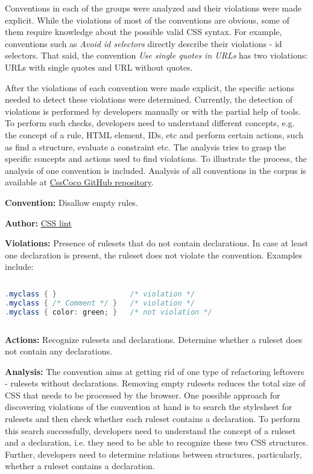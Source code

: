 Conventions in each of the groups were analyzed and their violations were made explicit. While the
violations of most of the conventions are obvious, some of them require knowledge about the possible
valid CSS syntax. For example, conventions such as \textit{Avoid id selectors} directly describe
their violations - id selectors. That said, the convention \textit{Use single quotes in URLs} has
two violations: URLs with single quotes and URL without quotes.

After the violations of each convention were made explicit, the specific actions needed to detect
these violations were determined. Currently, the detection of violations is performed by developers
manually or with the partial help of tools. To perform such checks, developers need to understand
different concepts, e.g. the concept of a rule, HTML element, IDs, etc and perform certain actions,
such as find a structure, evaluate a constraint etc. The analysis tries to grasp the specific
concepts and actions used to find violations. To illustrate the process, the analysis of one convention is included. Analysis of all conventions in the corpus is available at
\href{https://github.com/boryanagoncharenko/CssCoco/blob/master/analysis.md}{CssCoco GitHub
repository}.

\begin{description}
\item\textbf{Convention:} Disallow empty rules.
\item\textbf{Author:} \href{https://github.com/CSSLint/csslint/wiki/Disallow-empty-rules}{CSS lint}
\item\textbf{Violations:} Presence of rulesets that do not contain declarations. In case at least one declaration is present, the ruleset does not violate the convention. Examples include:
\begin{sourcecode}
\begin{lstlisting}[style=mono,language=Java]
.myclass { }                 /* violation */
.myclass { /* Comment */ }   /* violation */
.myclass { color: green; }   /* not violation */
\end{lstlisting}
\end{sourcecode}

\item\textbf{Actions:} Recognize rulesets and declarations. Determine whether a ruleset does not contain any declarations.

\item\textbf{Analysis:} The convention aims at getting rid of one type of refactoring leftovers -
rulesets without declarations. Removing empty rulesets reduces the total size of CSS that
needs to be processed by the browser. One possible approach for discovering violations of the
convention at hand is to search the stylesheet for rulesets and then check whether each ruleset
contains a declaration. To perform this search successfully, developers need to understand the
concept of a ruleset and a declaration, i.e. they need to be able to recognize these two CSS
structures. Further, developers need to determine relations between structures, particularly,
whether a ruleset contains a declaration.

\end{description}



